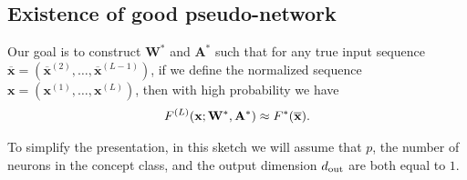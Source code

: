 \subsection{Existence of good pseudo-network}\label{sec:fitting-target}
Our goal is to construct $\mathbf{W}^{\ast}$ and $\mathbf{A}^{\ast}$ such that for any true input sequence $\overline{\mathbf{x}} = (\overline{\mathbf{x}}^{(2)}, \ldots, \overline{\mathbf{x}}^{(L-1)})$, if we define the normalized sequence $\mathbf{x} = (\mathbf{x}^{(1)}, \ldots, \mathbf{x}^{(L)})$, then with high probability we have
\begin{align}\label{eq:simplifiedFstar}
    F^{(L)}(\mathbf{x}; \mathbf{W}^{\ast}, \mathbf{A}^{\ast}) \approx   F^{\ast}(\overline{\mathbf{x}}).
\end{align}
\iffalse
The major challenge in constructing $\mathbf{W}^{\ast}$ and $\mathbf{A}^{\ast}$ is to use the information contained in $\mathbf{h}^{(\ell)}$ either explicitly in $\mathbf{h}^{(\ell)}$ or implicitly in $\mathbf{D}^{(i)}$ (recall \eqref{eqn:diagonal_main}). The construction of $\mathbf{W}^\ast$ 
in \cite{allen2019can} is not able to use this information and ignores it by treating it as noise (which is also non-trivial). Conceptually,
the idea underlying our construction is that $\mathbf{h}^{(\ell)}$ contains information about all the inputs $\bx^{(1)}, \ldots, \bx^{(\ell)}$ up until step $\ell$. Furthermore, this information can be recovered approximately by a linear transformation (Theorem~\ref{thm:Invertibility_ESN_outline}). Our construction sets $\mathbf{W}^{\ast} = \mathbf{0}$. This might suggest that we are  ignoring $\mathbf{h}^{(\ell)}$ as the RHS of \eqref{eqn:linear-approximation} becomes
\begin{align*} 
	F^{(L)}&(\bx; \mathbf{W}^\ast, \mathbf{A}^\ast) = \sum_{i=1}^{L}  \mathbf{Back}_{i \rightarrow L} \mathbf{D}^{(i)}  \mathbf{A'} \mathbf{x}^{(i)}.
\end{align*}
Moreover, this may appear to be a linear function in the $\mathbf{x}^{(i)}$. However, as just noted, $\mathbf{D}^{(i)}$ also implicitly has information about $\mathbf{h}^{(\ell)}$, and this is exploited in our construction of $\mathbf{A}^{\ast}$ to allow us to approximate general nonlinear functions of the $\mathbf{x}^{(i)}$.
\fi
To simplify the presentation, in this sketch we will assume that $p$, the number of neurons in the concept class, and the output dimension $d_{\mathrm{out}} $ are both equal to $1$. 
